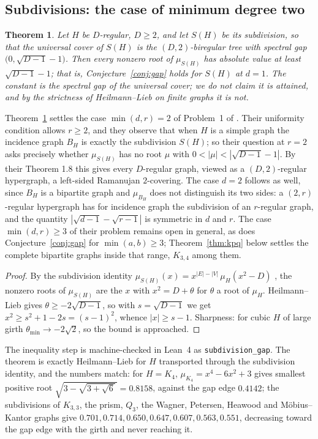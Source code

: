 \documentclass[11pt]{article}
\newtheorem{theorem}{Theorem}
\theoremstyle{remark}
\begin{document}
\subsection{Subdivisions: the case of minimum degree two}

\begin{theorem}\label{thm:subdiv}
Let $H$ be $D$-regular, $D\ge2$, and let $S(H)$ be its subdivision, so that the
universal cover of $S(H)$ is the $(D,2)$-biregular tree with spectral gap
$\bigl(0,\sqrt{D-1}-1\bigr)$. Then every nonzero root of $\mu_{S(H)}$ has
absolute value at least $\sqrt{D-1}-1$; that is,
Conjecture~\ref{conj:gap} holds for $S(H)$ at $d=1$. The constant is the spectral
gap of the universal cover; we do not claim it is attained, and by the strictness
of Heilmann--Lieb on finite graphs it is not.
\end{theorem}

Theorem~\ref{thm:subdiv} settles the case $\min(d,r)=2$ of Problem~1 of
\cite{SFM}.
Their uniformity condition allows $r\ge2$, and they observe that when $H$ is a
simple graph the incidence graph $B_H$ is exactly the subdivision $S(H)$; so
their question at $r=2$ asks precisely whether $\mu_{S(H)}$ has no root $\mu$
with $0<|\mu|<|\sqrt{D-1}-1|$. By their Theorem 1.8 this gives every
$D$-regular graph, viewed as a $(D,2)$-regular hypergraph, a left-sided
Ramanujan $2$-covering. The case $d=2$ follows as well, since $B_H$ is a
bipartite graph and $\mu_{B_H}$ does not distinguish its two sides: a
$(2,r)$-regular hypergraph has for incidence graph the subdivision of an
$r$-regular graph, and the quantity $|\sqrt{d-1}-\sqrt{r-1}|$ is symmetric in
$d$ and $r$. The case $\min(d,r)\ge3$ of their problem remains open in general, as does
Conjecture~\ref{conj:gap} for $\min(a,b)\ge3$; Theorem~\ref{thm:kpq} below settles the
complete bipartite graphs inside that range, $K_{3,4}$ among them.

\begin{proof}
By the subdivision identity $\mu_{S(H)}(x)=x^{|E|-|V|}\,\mu_H(x^2-D)$
\cite{WWM}, the nonzero roots of $\mu_{S(H)}$ are the $x$ with $x^2=D+\theta$
for $\theta$ a root of $\mu_H$. Heilmann--Lieb gives $\theta\ge-2\sqrt{D-1}$,
so with $s=\sqrt{D-1}$ we get $x^2\ge s^2+1-2s=(s-1)^2$, whence
$|x|\ge s-1$. Sharpness: for cubic $H$ of large girth $\theta_{\min}\to-2\sqrt2$,
so the bound is approached.
\end{proof}

The inequality step is machine-checked in Lean~4 as \texttt{subdivision\_gap}.
The theorem is exactly Heilmann--Lieb for $H$ transported through the
subdivision identity, and the numbers match: for $H=K_4$, $\mu_{K_4}=x^4-6x^2+3$
gives smallest positive root $\sqrt{3-\sqrt{3+\sqrt6}\,}=0.8158$, against the
gap edge $0.4142$; the subdivisions of $K_{3,3}$, the prism, $Q_3$, the Wagner,
Petersen, Heawood and M\"obius--Kantor graphs give
$0.701,0.714,0.650,0.647,0.607,0.563,0.551$, decreasing toward the gap edge
with the girth and never reaching it.
\end{document}
